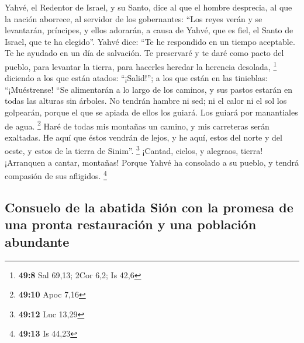 \begin{paracol}{2}
 Yahvé, el Redentor de Israel, y su Santo, dice al que el
hombre desprecia, al que la nación aborrece, al servidor de los
gobernantes: ``Los reyes verán y se levantarán, príncipes, y ellos
adorarán, a causa de Yahvé, que es fiel, el Santo de Israel, que te ha
elegido''.  Yahvé dice: ``Te he respondido en un tiempo
aceptable. Te he ayudado en un día de salvación. Te preservaré y te daré
como pacto del pueblo, para levantar la tierra, para hacerles heredar la
herencia desolada, \footnote{\textbf{49:8} Sal 69,13; 2Cor 6,2; Is 42,6}
 diciendo a los que están atados: ``¡Salid!''; a los que
están en las tinieblas: ``¡Muéstrense! ``Se alimentarán a lo largo de
los caminos, y sus pastos estarán en todas las alturas sin árboles.
 No tendrán hambre ni sed; ni el calor ni el sol los
golpearán, porque el que se apiada de ellos los guiará. Los guiará por
manantiales de agua. \footnote{\textbf{49:10} Apoc 7,16} 
Haré de todas mis montañas un camino, y mis carreteras serán exaltadas.
 He aquí que éstos vendrán de lejos, y he aquí, estos del
norte y del oeste, y estos de la tierra de Sinim''. \footnote{\textbf{49:12}
  Luc 13,29}  ¡Cantad, cielos, y alegraos, tierra!
¡Arranquen a cantar, montañas! Porque Yahvé ha consolado a su pueblo, y
tendrá compasión de sus afligidos. \footnote{\textbf{49:13} Is 44,23}

\hypertarget{consuelo-de-la-abatida-siuxf3n-con-la-promesa-de-una-pronta-restauraciuxf3n-y-una-poblaciuxf3n-abundante}{%
\subsection{Consuelo de la abatida Sión con la promesa de una pronta
restauración y una población
abundante}\label{consuelo-de-la-abatida-siuxf3n-con-la-promesa-de-una-pronta-restauraciuxf3n-y-una-poblaciuxf3n-abundante}}


\end{paracol}

